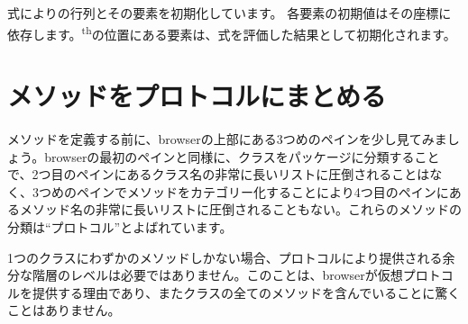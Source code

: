 \documentclass[a4paper,10pt,twoside]{book}
\begin{document}
式によりの行列とその要素を初期化しています。 各要素の初期値はその座標に依存します。\textsuperscript{th}の位置にある要素は、式を評価した結果として初期化されます。





\section{メソッドをプロトコルにまとめる}

メソッドを定義する前に、browserの上部にある3つめのペインを少し見てみましょう。browserの最初のペインと同様に、クラスをパッケージに分類することで、2つ目のペインにあるクラス名の非常に長いリストに圧倒されることはなく、3つめのペインでメソッドをカテゴリー化することにより4つ目のペインにあるメソッド名の非常に長いリストに圧倒されることもない。これらのメソッドの分類は``プロトコル''とよばれています。

1つのクラスにわずかのメソッドしかない場合、プロトコルにより提供される余分な階層のレベルは必要ではありません。このことは、browserが仮想プロトコルを提供する理由であり、またクラスの全てのメソッドを含んでいることに驚くことはありません。
\end{document}
